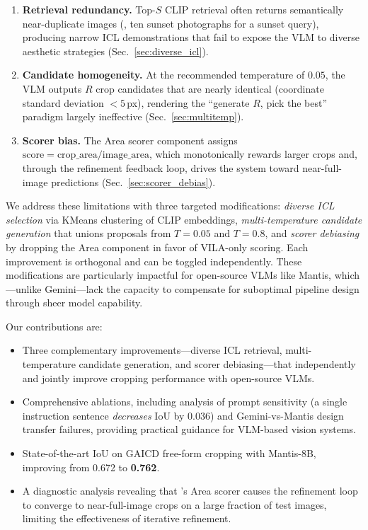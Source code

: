 \begin{enumerate}
    \item \textbf{Retrieval redundancy.}  Top-$S$ CLIP retrieval often
    returns semantically near-duplicate images (\eg, ten sunset
    photographs for a sunset query), producing narrow ICL
    demonstrations that fail to expose the VLM to diverse aesthetic
    strategies (Sec.~\ref{sec:diverse_icl}).

    \item \textbf{Candidate homogeneity.}  At the recommended
    temperature of $0.05$, the VLM outputs $R$ crop candidates that
    are nearly identical (coordinate standard deviation $< 5$\,px),
    rendering the ``generate $R$, pick the best'' paradigm largely
    ineffective (Sec.~\ref{sec:multitemp}).

    \item \textbf{Scorer bias.}  The Area scorer component assigns
    $\text{score} = \text{crop\_area} / \text{image\_area}$, which
    monotonically rewards larger crops and, through the refinement
    feedback loop, drives the system toward near-full-image predictions
    (Sec.~\ref{sec:scorer_debias}).
\end{enumerate}

We address these limitations with three targeted modifications:
\emph{diverse ICL selection} via KMeans clustering of CLIP embeddings,
\emph{multi-temperature candidate generation} that unions proposals from
$T{=}0.05$ and $T{=}0.8$, and \emph{scorer debiasing} by dropping the
Area component in favor of VILA-only scoring.  Each improvement is
orthogonal and can be toggled independently.  These modifications are
particularly impactful for open-source VLMs like Mantis, which---unlike
Gemini---lack the capacity to compensate for suboptimal pipeline design
through sheer model capability.

Our contributions are:
\begin{itemize}
    \item Three complementary improvements---diverse ICL retrieval,
    multi-temperature candidate generation, and scorer
    debiasing---that independently and jointly improve cropping
    performance with open-source VLMs.
    \item Comprehensive ablations, including analysis of prompt
    sensitivity (a single instruction sentence \emph{decreases} IoU by
    0.036) and Gemini-vs-Mantis design transfer failures, providing
    practical guidance for VLM-based vision systems.
    \item State-of-the-art IoU on GAICD free-form cropping with
    Mantis-8B, improving from 0.672 to \textbf{0.762}.
    \item A diagnostic analysis revealing that \baseline's Area scorer
    causes the refinement loop to converge to near-full-image crops on
    a large fraction of test images, limiting the effectiveness of
    iterative refinement.
\end{itemize}
